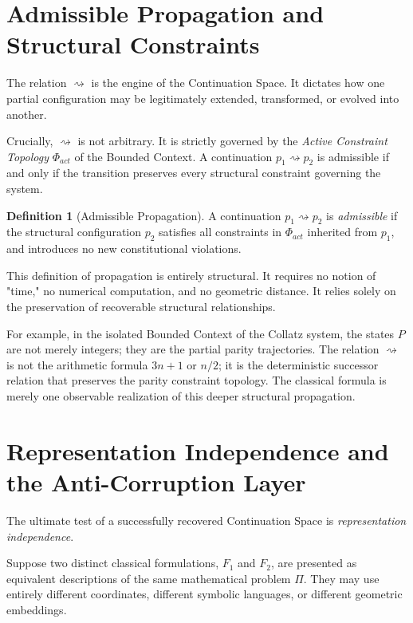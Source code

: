\documentclass[12pt,openany]{extbook}
\theoremstyle{plain}
\theoremstyle{definition}
\newtheorem{definition}{Definition}[chapter]
\begin{document}
\section{Admissible Propagation and Structural Constraints}

The relation $\rightsquigarrow$ is the engine of the Continuation Space. It dictates how one partial configuration may be legitimately extended, transformed, or evolved into another. 

Crucially, $\rightsquigarrow$ is not arbitrary. It is strictly governed by the \emph{Active Constraint Topology} $\Phi_{act}$ of the Bounded Context. A continuation $p_1 \rightsquigarrow p_2$ is admissible if and only if the transition preserves every structural constraint governing the system.

\begin{definition}[Admissible Propagation]
A continuation $p_1 \rightsquigarrow p_2$ is \emph{admissible} if the structural configuration $p_2$ satisfies all constraints in $\Phi_{act}$ inherited from $p_1$, and introduces no new constitutional violations.
\end{definition}

This definition of propagation is entirely structural. It requires no notion of "time," no numerical computation, and no geometric distance. It relies solely on the preservation of recoverable structural relationships. 

For example, in the isolated Bounded Context of the Collatz system, the states $P$ are not merely integers; they are the partial parity trajectories. The relation $\rightsquigarrow$ is not the arithmetic formula $3n+1$ or $n/2$; it is the deterministic successor relation that preserves the parity constraint topology. The classical formula is merely one observable realization of this deeper structural propagation.

\section{Representation Independence and the Anti-Corruption Layer}

The ultimate test of a successfully recovered Continuation Space is \emph{representation independence}. 

Suppose two distinct classical formulations, $F_1$ and $F_2$, are presented as equivalent descriptions of the same mathematical problem $\Pi$. They may use entirely different coordinates, different symbolic languages, or different geometric embeddings. 
\end{document}
